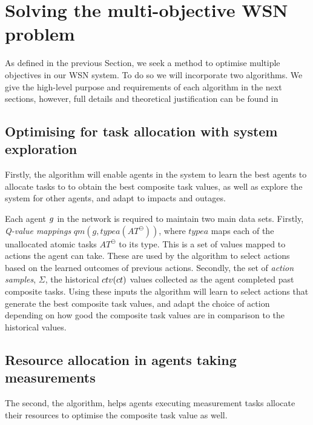 \section{Solving the multi-objective WSN problem}
\label{section:solution}
As defined in the previous Section, we seek a method to optimise multiple objectives in our WSN system. To do so we will incorporate two algorithms. We give the high-level purpose and requirements of each algorithm in the next sections, however, full details and theoretical justification can be found in 

\subsection{Optimising for task allocation with system exploration}

Firstly, the \acronymATARIAExtended{}{} algorithm will enable agents in the system to learn the best agents to allocate tasks to to obtain the best composite task values, as well as explore the system for other agents, and adapt to impacts and outages.

Each agent $g_{}^{}$ in the network is required to maintain two main data sets. Firstly, \textit{Q-value mappings} $qm(g, typea(AT^{\ominus}))$, where $typea$ maps each of the unallocated atomic tasks $AT^{\ominus}$ to its type. This is a set of values mapped to actions the agent can take. These are used by the \acronymATARIA{}{} algorithm to select actions based on the learned outcomes of previous actions. Secondly, the set of \textit{action samples}, $\Sigma$, the historical $\functionCompositeTaskValue{}{}$ values collected as the agent completed past composite tasks. Using these inputs the \acronymATARIA{}{} algorithm will learn to select actions that generate the best composite task values, and adapt the choice of action depending on how good the composite task values are in comparison to the historical values.


\subsection{Resource allocation in agents taking measurements}

The second, the \acronymMGRAOExtended{}{} algorithm, helps agents executing measurement tasks allocate their resources to optimise the composite task value as well.

